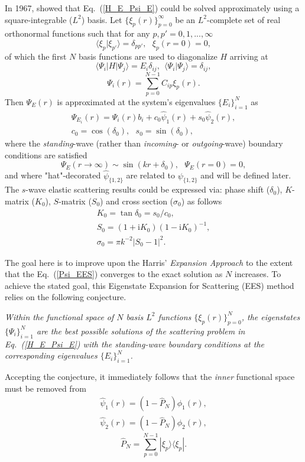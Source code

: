 \documentclass[aip
, pra
, showpacs
, aps
, twocolumn
, groupedaddress
, floatfix
]{revtex4}
\newcommand{\beq}{\begin{equation}}
\newcommand{\eeq}{\end{equation}}
\newcommand{\barr}{\begin{array}}
\newcommand{\earr}{\end{array}}
\begin{document}
In 1967, \citet{Harris67} showed that Eq.~(\ref{H_E_Psi_E}) could be solved 
approximately using a square-integrable ($L^2$) basis.
Let $\{\xi_p(r)\}_{p=0}^\infty$ be an $L^2$-complete set of real orthonormal functions
such that for any $p,p'=0,1,...,\infty$
\beq
\langle \xi_p | \xi_{p'} \rangle=\delta_{pp'}, \ \ \ \xi_p(r=0)=0,
\eeq
of which the first $N$ basis functions are used to diagonalize $H$ arriving at
\beq
\langle \Psi_i |H| \Psi_j \rangle = E_i \delta_{ij} , \ \ \langle \Psi_i | \Psi_j \rangle=\delta_{ij},
\eeq
\beq
\Psi_i(r) = \sum_{p=0}^{N-1} C_{ip} \xi_p(r).
\eeq
Then $\Psi_E(r)$ is approximated at the system's eigenvalues $\{E_i\}_{i=1}^{N}$ as 
\cite{Harris67}
\beq \barr{l}
\Psi_{E_i}(r) = \Psi_i(r) b_i  + c_0 \hat{\psi}_1(r)  + s_0 \hat{\psi}_2(r),\\ 
c_0 = \cos(\delta_0), \ \ \ s_0 = \sin(\delta_0),
\earr \label{Psi_EES} \eeq
where the {\em standing}-wave (rather than {\em incoming}- or {\em outgoing}-wave) boundary conditions are satisfied
\beq
\Psi_E(r \rightarrow \infty) \sim \sin(kr+\delta_0), \ \ \ \Psi_E(r= 0)=0,
\eeq
and where "hat"-decorated $\hat{\psi}_{\{1,2\}}$ are related to $\psi_{\{1,2\}}$ and will be defined later.
The $s$-wave elastic scattering results could be expressed via:
phase shift ($\delta_0$), $K$-matrix ($K_0$), $S$-matrix ($S_{0}$) and cross section ($\sigma_{0}$) 
as follows
\beq \barr{l}
K_0 = \tan{\delta_0} = s_0 / c_0, \\
S_{0}=(1+\mbox{i}K_0)(1-\mbox{i}K_0)^{-1}, \\
\sigma_{0}=\pi k^{-2} |S_{0}-1|^2.
\earr \eeq


The goal here is to improve upon the Harris' {\em Expansion Approach} \cite{Harris67} to the extent that the Eq.~(\ref{Psi_EES}) 
converges to the exact solution as $N$ increases. 
To achieve the stated goal, this Eigenstate Expansion for Scattering (EES) method relies on the following conjecture.


{\em Within the functional space of $N$ basis $L^2$ functions  $\{\xi_p(r)\}_{p=0}^N$, 
the eigenstates $\{\Psi_i\}_{i=1}^{N}$ are the best possible solutions of the scattering problem in Eq.~(\ref{H_E_Psi_E})
with the standing-wave boundary conditions at the corresponding eigenvalues $\{E_i\}_{i=1}^{N}$.
}


Accepting the conjecture, it immediately follows that the {\em inner} functional space must be removed from 
\beq \barr{l}
\hat{\psi}_1(r) = (1-\hat{P}_N) \phi_1(r),\\
\hat{\psi}_2(r) = (1-\hat{P}_N) \phi_2(r),
\earr \eeq
\beq
\hat{P}_N = \sum_{p=0}^{N-1} | \xi_p \rangle \langle \xi_p |.
\eeq
\end{document}

